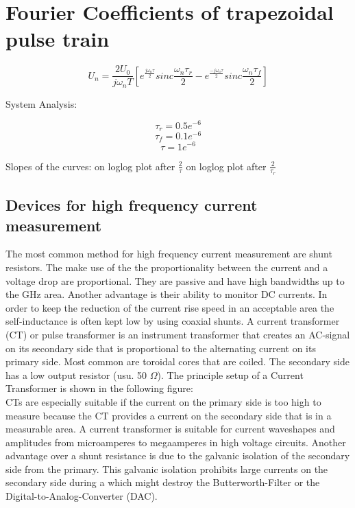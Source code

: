 \section{Fourier Coefficients of trapezoidal pulse  train }


\begin{equation}
 U_n = \frac{2 U_0}{j \omega_n T} [e^{\frac{j \omega_n \tau}{2}} sinc{\frac { \omega_n \tau_r }{2}} -e^{\frac{-j \omega_n \tau}{2}} sinc{\frac{ \omega_n \tau_f}{2}}]
\end{equation}
 
System Analysis: 
 
 
\begin{equation}
 \tau_r = 0.5e^{-6 }
  \end{equation}
  \begin{equation}
 \tau_f = 0.1e^{-6}
  \end{equation}
 \begin{equation}
\tau= 1e^{-6}
 \end{equation}
 
Slopes of the curves:  on loglog plot after $\frac{2}{\tau}$  on loglog plot after $\frac{2}{\tau_r}$



	
\subsection{Devices for high frequency current measurement}
The most common method for high frequency current measurement are shunt resistors. The make use of the the proportionality between the current and a voltage drop are proportional. They are passive and have high bandwidths up to the GHz area. Another advantage is their ability to monitor DC currents. In order to keep the reduction of the current rise speed in an acceptable area the self-inductance is often kept low by using coaxial shunts. \cite{highdynamiccurrent}
A current transformer (CT) or pulse transformer is an instrument transformer that creates an AC-signal on its secondary side that is proportional to the alternating current on its primary side. Most common are toroidal cores that are coiled. The secondary side has a low output resistor (usu. 50 $\Omega$).
The principle setup of a Current Transformer is shown in the following figure: 
\\CTs are especially suitable if the current on the primary side is too high to measure because the CT provides a current on the secondary side that is in a measurable area. A current transformer is suitable for current waveshapes and amplitudes from microamperes to megaamperes in high voltage circuits. Another advantage over a shunt resistance is due to the galvanic isolation of the secondary side from the primary. This galvanic isolation prohibits large currents on the secondary side during a  which might destroy the Butterworth-Filter or the Digital-to-Analog-Converter (DAC). 


